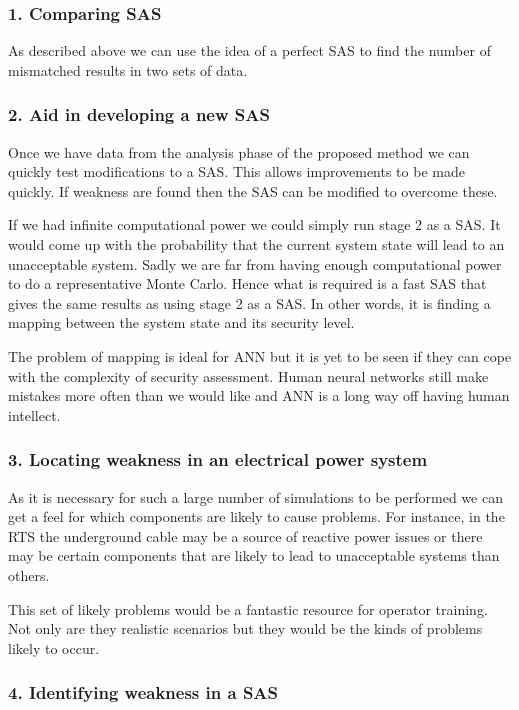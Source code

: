 \documentclass[a4paper,oneside,12pt]{report}
\begin{document}
\subsubsection{1. Comparing SAS}

As described above we can use the idea of a perfect SAS to find the number of mismatched results in two sets of data.

\subsubsection{2. Aid in developing a new SAS}

Once we have data from the analysis phase of the proposed method we can quickly test modifications to a SAS. This allows improvements to be made quickly. If weakness are found then the SAS can be modified to overcome these.

If we had infinite computational power we could simply run stage 2 as a SAS. It would come up with the probability that the current system state will lead to an unacceptable system. Sadly we are far from having enough computational power to do a representative Monte Carlo. Hence what is required is a fast SAS that gives the same results as using stage 2 as a SAS. In other words, it is finding a mapping between the system state and its security level.

The problem of mapping is ideal for ANN but it is yet to be seen if they can cope with the complexity of security assessment. Human neural networks still make mistakes more often than we would like and ANN is a long way off having human intellect.

\subsubsection{3. Locating weakness in an electrical power system}

As it is necessary for such a large number of simulations to be performed we can get a feel for which components are likely to cause problems. For instance, in the RTS the underground cable may be a source of reactive power issues or there may be certain components that are likely to lead to unacceptable systems than others.

This set of likely problems would be a fantastic resource for operator training. Not only are they realistic scenarios but they would be the kinds of problems likely to occur.

\subsubsection{4. Identifying weakness in a SAS}
\end{document}
